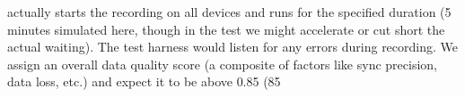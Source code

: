 actually starts the recording on all devices and runs for the specified duration (5 minutes simulated here, though in the test we might accelerate or cut short the actual waiting). The test harness would listen for any errors during recording. We assign an overall data quality score (a composite of factors like sync precision, data loss, etc.) and expect it to be above 0.85 (85%